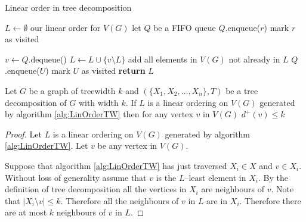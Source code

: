 \begin{algorithm}[h]
    \caption{Linear order in tree decomposition}
    \label{alg:LinOrderTW}
    \begin{algorithmic}[1]
        
            \State $L \gets \emptyset$ \Comment our linear order for $V(G)$
            \State let $Q$ be a FIFO queue 
            \State $Q$.enqueue($r$)
            \State mark $r$ as visited
            
                \State $v \gets Q$.dequeue()
                \State $L \gets L \cup \{v\setminus L\}$ \Comment add all elements in $V(G)$ not already in $L$
                    \State $Q$.enqueue($U$)
                    \State mark $U$ as visited
                \EndFor        
            \EndWhile 
            \State \textbf{return}  $L$
        \EndFunction
    \end{algorithmic}
\end{algorithm}

\begin{lemma}[Askes] \label{Lemma_TWLinOrdBound}
    Let $G$ be a graph of treewidth $k$ and $(\{X_1,X_2,\dots,X_n\},T)$ be a tree decomposition of $G$ with width $k$.
    If $L$ is a linear ordering on $V(G)$ generated by algorithm \ref{alg:LinOrderTW} then for any vertex $v$ in $V(G)$ 
    $d^+(v) \leq k$
\end{lemma}

\begin{proof}    
    Let $L$ is a linear ordering on $V(G)$ generated by algorithm \ref{alg:LinOrderTW}. Let $v$ be any vertex in $V(G)$. %
    
    Suppose that algorithm \ref{alg:LinOrderTW} has just traversed $X_i\in X$ and $v\in X_i$. Without loss of generality assume that $v$ is the $L$--least element in $X_i$. By the definition of tree decomposition all the vertices in $X_i$ are neighbours of $v$. Note that $|X_i\setminus v|\leq k$. Therefore all the neighbours of $v$ in $L$ are in $X_i$. Therefore there are at most $k$ neighbours of $v$ in $L$.   
\end{proof}

